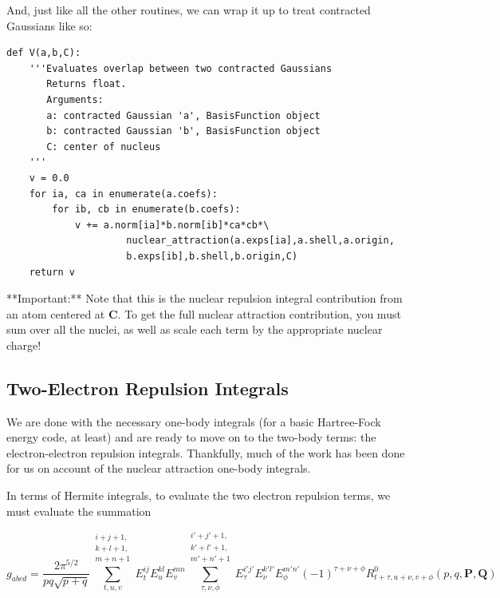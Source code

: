And, just like all the other routines, we can wrap it up to treat
contracted Gaussians like so:

\begin{lstlisting}[style=MyPython]
def V(a,b,C):
    '''Evaluates overlap between two contracted Gaussians
       Returns float.
       Arguments:
       a: contracted Gaussian 'a', BasisFunction object
       b: contracted Gaussian 'b', BasisFunction object
       C: center of nucleus
    '''
    v = 0.0
    for ia, ca in enumerate(a.coefs):
        for ib, cb in enumerate(b.coefs):
            v += a.norm[ia]*b.norm[ib]*ca*cb*\
                     nuclear_attraction(a.exps[ia],a.shell,a.origin,
                     b.exps[ib],b.shell,b.origin,C)
    return v
\end{lstlisting}

**Important:** Note that this is the nuclear repulsion integral
contribution from an atom centered at $\mathbf{C}$. To get the full
nuclear attraction contribution, you must sum over all the nuclei, as
well as scale each term by the appropriate nuclear charge!

\subsection{Two-Electron Repulsion Integrals}

We are done with the necessary one-body integrals (for a basic
Hartree-Fock energy code, at least) and are ready to move on to the
two-body terms: the electron-electron repulsion integrals. Thankfully,
much of the work has been done for us on account of the nuclear
attraction one-body integrals.

In terms of Hermite integrals, to evaluate the two electron repulsion
terms, we must evaluate the summation

\begin{equation}
  g_{abcd} 
  = 
  \frac{2\pi^{5/2}}{pq\sqrt{p+q}}  
  \sum\limits_{t,u,v}^{\substack{i+j+1,\\k+l+1,\\m+n+1}} E_t^{ij} E_u^{kl} E_v^{mn} 
  \sum\limits_{\tau,\nu,\phi}^{\substack{i'+j'+1,\\k'+l'+1,\\m'+n'+1}} E_{\tau}^{i'j'} E_{\nu}^{k'l'} E_{\phi}^{m'n'} (-1)^{\tau+\nu+\phi} R^0_{t+\tau,u + \nu, v+\phi}(p,q,\mathbf{P},\mathbf{Q})
\end{equation}


